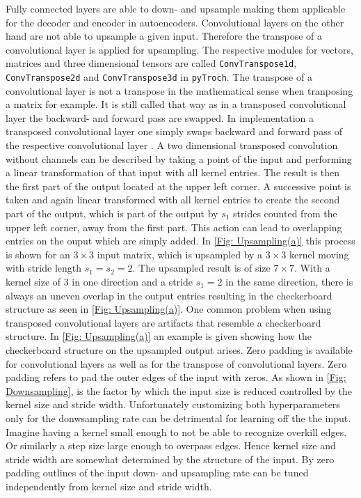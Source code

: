 Fully connected layers are able to down- and upsample making them applicable for the decoder and encoder in autoencoders. Convolutional layers on the other hand are not able to upsample a given input. Therefore the transpose of a convolutional layer is applied for upsampling. The respective modules for vectors, matrices and three dimensional tensors are called \texttt{ConvTranspose1d}, \texttt{ConvTranspose2d} and \texttt{ConvTranspose3d} in \texttt{pyTroch}. The transpose of a convolutional layer is not a transpose in the mathematical sense when tranposing a matrix for example. It is still called that way as in a transposed convolutional layer the backward- and forward pass are swapped. In implementation a transposed convolutional layer one simply swaps backward and forward pass of the respective convolutional layer \cite{Goodfellow}. A two dimensional transposed convolution without channels can be described by taking a point of the input and performing a linear transformation of that input with all kernel entries. The result is then the first part of the output located at the upper left corner. A successive point is taken and again linear transformed with all kernel entries to create the second part of the output, which is part of the output by $s_1$ strides counted from the upper left corner, away from the first part. This action can lead to overlapping entries on the ouput which are simply added. In \cref{Fig: Upsampling(a)} this process is shown for an $3 \times 3$ input matrix, which is upsampled by a $3\times 3$ kernel moving with stride length $s_1=s_2=2$. The upsampled result is of size $7 \times 7$. With a kernel size of 3 in one direction and a stride $s_1=2$ in the same direction, there is always an uneven overlap in the output entries resulting in the checkerboard structure as seen in \cref{Fig: Upsampling(a)}. One common problem when using transposed convolutional layers are artifacts that resemble a checkerboard structure. In \cref{Fig: Upsampling(a)} an example is given showing how the checkerboard structure on the upsampled output arises.
Zero padding is available for convolutional layers as well as for the transpose of convolutional layers. Zero padding refers to pad the outer edges of the input with zeros. As shown in \cref{Fig: Downsampling}, is the factor by which the input size is reduced controlled by the kernel size and stride width. Unfortunately customizing both hyperparameters only for the donwsampling rate can be detrimental for learning off the the input. Imagine having a kernel small enough to not be able to recognize overkill edges. Or similarly a step size large enough to overpass edges. Hence kernel size and stride width are somewhat determined by the structure of the input. By zero padding outlines of the input down- and upsampling rate can be tuned independently from kernel size and stride width.
